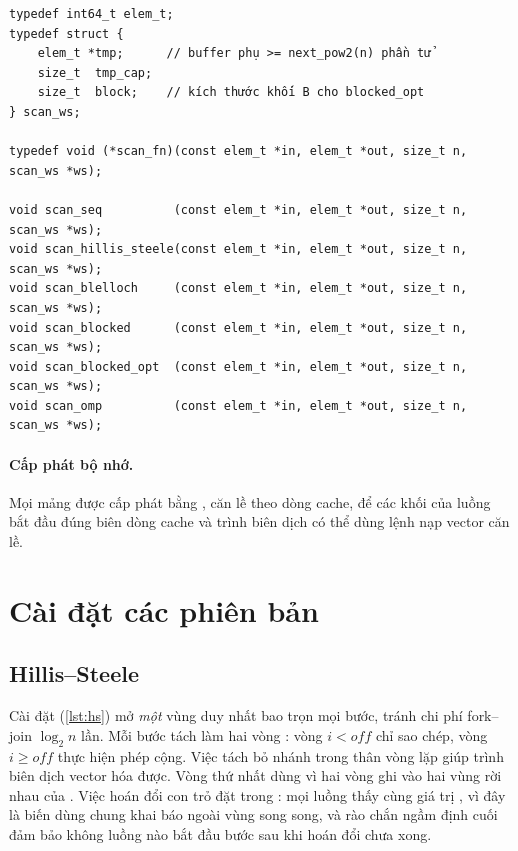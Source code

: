 \begin{lstlisting}[caption={Giao diện chung trong \texttt{scan.h} (rút gọn).},label={lst:iface}]
typedef int64_t elem_t;
typedef struct {
    elem_t *tmp;      // buffer phụ >= next_pow2(n) phần tử
    size_t  tmp_cap;
    size_t  block;    // kích thước khối B cho blocked_opt
} scan_ws;

typedef void (*scan_fn)(const elem_t *in, elem_t *out, size_t n, scan_ws *ws);

void scan_seq          (const elem_t *in, elem_t *out, size_t n, scan_ws *ws);
void scan_hillis_steele(const elem_t *in, elem_t *out, size_t n, scan_ws *ws);
void scan_blelloch     (const elem_t *in, elem_t *out, size_t n, scan_ws *ws);
void scan_blocked      (const elem_t *in, elem_t *out, size_t n, scan_ws *ws);
void scan_blocked_opt  (const elem_t *in, elem_t *out, size_t n, scan_ws *ws);
void scan_omp          (const elem_t *in, elem_t *out, size_t n, scan_ws *ws);
\end{lstlisting}

\paragraph{Cấp phát bộ nhớ.} Mọi mảng được cấp phát bằng , căn
lề theo dòng cache, để các khối của luồng bắt đầu đúng biên dòng cache và trình biên dịch có thể
dùng lệnh nạp vector căn lề.

\section{Cài đặt các phiên bản}
\label{sec:impl-versions}

\subsection{Hillis--Steele}

Cài đặt (\cref{lst:hs}) mở \emph{một} vùng  duy nhất bao trọn mọi bước, tránh chi
phí fork--join \(\log_2 n\) lần. Mỗi bước tách làm hai vòng : vòng \(i < \mathit{off}\)
chỉ sao chép, vòng \(i \ge \mathit{off}\) thực hiện phép cộng. Việc tách bỏ nhánh  trong
thân vòng lặp giúp trình biên dịch vector hóa được. Vòng thứ nhất dùng  vì hai vòng
ghi vào hai vùng rời nhau của . Việc hoán đổi con trỏ đặt trong : mọi luồng
thấy cùng giá trị ,  vì đây là biến dùng chung khai báo ngoài vùng song song, và
rào chắn ngầm định cuối  đảm bảo không luồng nào bắt đầu bước sau khi hoán đổi chưa
xong.

